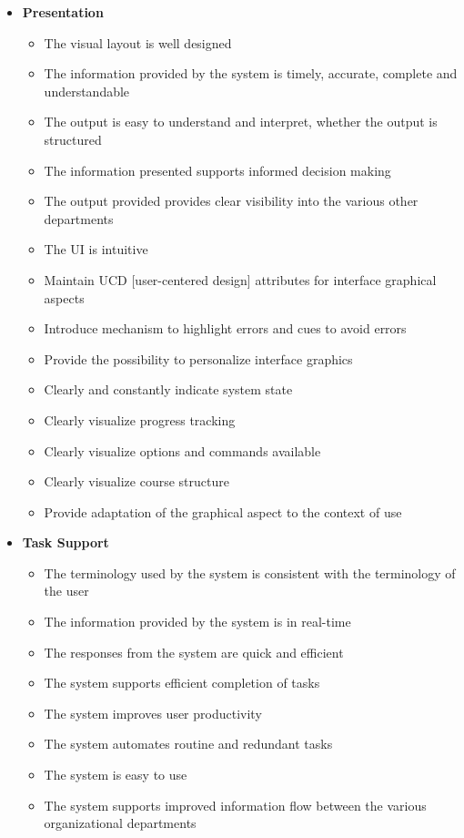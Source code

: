\begin{itemize}
	\item \textbf{Presentation}
		\begin{itemize}
			\item The visual layout is well designed
			\item The information provided by the system is timely, accurate, complete and understandable
			\item The output is easy to understand and interpret, whether the output is structured
			\item The information presented supports informed decision making
			\item The output provided provides clear visibility into the various other departments
			\item The UI is intuitive
			\item Maintain UCD [user-centered design] attributes for interface graphical aspects
			\item Introduce mechanism to highlight errors and cues to avoid errors
			\item Provide the possibility to personalize interface graphics
			\item Clearly and constantly indicate system state
			\item Clearly visualize progress tracking
			\item Clearly visualize options and commands available
			\item Clearly visualize course structure
			\item Provide adaptation of the graphical aspect to the context of use
		\end{itemize}
		
	\item \textbf{Task Support}
		\begin{itemize}
			\item The terminology used by the system is consistent with the terminology of the user
			\item The information provided by the system is in real-time
			\item The responses from the system are quick and efficient
			\item The system supports efficient completion of tasks
			\item The system improves user productivity
			\item The system automates routine and redundant tasks
			\item The system is easy to use
			\item The system supports improved information flow between the various organizational departments
		\end{itemize}
		

\end{itemize}
